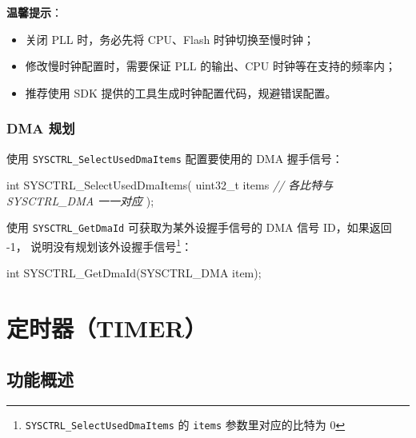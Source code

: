 \documentclass[
  12pt,
]{book}
\makeatletter
\newenvironment{Shaded}{\begin{snugshade}}{\end{snugshade}}
\newcommand{\CommentTok}[1]{\textcolor[rgb]{0.56,0.35,0.01}{\textit{#1}}}
\newcommand{\DataTypeTok}[1]{\textcolor[rgb]{0.13,0.29,0.53}{#1}}
\newcommand{\NormalTok}[1]{#1}
\providecommand{\tightlist}{%
  \setlength{\itemsep}{0pt}\setlength{\parskip}{0pt}}
\newenvironment{kframe}{%
\medskip{}
\setlength{\fboxsep}{.8em}
 \def\at@end@of@kframe{}%
 \ifinner\ifhmode%
  \def\at@end@of@kframe{\end{minipage}}%
  \begin{minipage}{\columnwidth}%
 \fi\fi%
 \def\FrameCommand##1{\hskip\@totalleftmargin \hskip-\fboxsep
 \colorbox{shadecolor}{##1}\hskip-\fboxsep
     \hskip-\linewidth \hskip-\@totalleftmargin \hskip\columnwidth}%
 \MakeFramed {\advance\hsize-\width
   \@totalleftmargin\z@ \linewidth\hsize
   \@setminipage}}%
 {\par\unskip\endMakeFramed%
 \at@end@of@kframe}
\newenvironment{rmdblock}[1]
  {
  \begin{itemize}
  \renewcommand{\labelitemi}{
    \raisebox{-.7\height}[0pt][0pt]{
      {\setkeys{Gin}{width=3em,keepaspectratio}\texttt{[image: images/\#1]}}
    }
  }
  \setlength{\fboxsep}{1em}
  \begin{kframe}
  \item
  }
  {
  \end{kframe}
  \end{itemize}
  }
\newenvironment{rmdnote}
  {\begin{rmdblock}{note}}
  {\end{rmdblock}}
\makeatother
\begin{document}
\begin{rmdnote}
\textbf{温馨提示}：

\begin{itemize}
\tightlist
\item
  关闭 PLL 时，务必先将 CPU、Flash 时钟切换至慢时钟；
\item
  修改慢时钟配置时，需要保证 PLL 的输出、CPU 时钟等在支持的频率内；
\item
  推荐使用 SDK 提供的工具生成时钟配置代码，规避错误配置。
\end{itemize}
\end{rmdnote}

\hypertarget{dma-ux89c4ux5212-1}{%
\subsection{DMA 规划}\label{dma-ux89c4ux5212-1}}

使用 \texttt{SYSCTRL\_SelectUsedDmaItems} 配置要使用的 DMA 握手信号：

\begin{Shaded}
\begin{Highlighting}[]
\DataTypeTok{int}\NormalTok{ SYSCTRL_SelectUsedDmaItems(}
  \DataTypeTok{uint32_t}\NormalTok{ items }\CommentTok{// 各比特与 SYSCTRL_DMA 一一对应}
\NormalTok{  );}
\end{Highlighting}
\end{Shaded}

使用 \texttt{SYSCTRL\_GetDmaId} 可获取为某外设握手信号的 DMA 信号 ID，如果返回 -1，
说明没有规划该外设握手信号\footnote{\texttt{SYSCTRL\_SelectUsedDmaItems} 的 \texttt{items} 参数里对应的比特为 0}：

\begin{Shaded}
\begin{Highlighting}[]
\DataTypeTok{int}\NormalTok{ SYSCTRL_GetDmaId(SYSCTRL_DMA item);}
\end{Highlighting}
\end{Shaded}

\hypertarget{ch-timer}{%
\chapter{定时器（TIMER）}\label{ch-timer}}

\hypertarget{ux529fux80fdux6982ux8ff0-6}{%
\section{功能概述}\label{ux529fux80fdux6982ux8ff0-6}}
\end{document}
